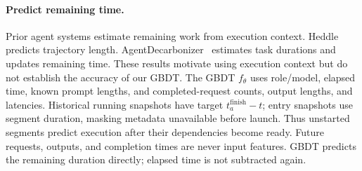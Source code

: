 \paragraph{Predict remaining time.}
Prior agent systems estimate remaining work from execution context.
Heddle~\cite{zhang2026heddle} predicts trajectory length.
AgentDecarbonizer~\cite{yan2026agentdecarbonizer} estimates task durations
and updates remaining time. These results motivate
using execution context but do not establish the accuracy of our GBDT.
The GBDT $f_\theta$ uses role/model, elapsed time, known prompt lengths,
and completed-request counts, output lengths, and latencies.
Historical running snapshots have target $t_a^{\mathrm{finish}}-t$;
entry snapshots use segment duration, masking metadata unavailable
before launch. Thus unstarted segments predict execution after their
dependencies become ready. Future requests, outputs, and completion
times are never input features. GBDT predicts the remaining duration
directly; elapsed time is not subtracted again.

